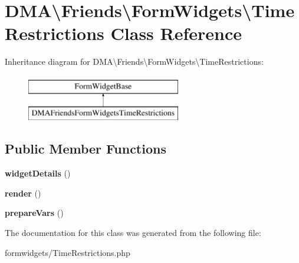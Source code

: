 \hypertarget{classDMA_1_1Friends_1_1FormWidgets_1_1TimeRestrictions}{\section{D\-M\-A\textbackslash{}Friends\textbackslash{}Form\-Widgets\textbackslash{}Time\-Restrictions Class Reference}
\label{classDMA_1_1Friends_1_1FormWidgets_1_1TimeRestrictions}
}
Inheritance diagram for D\-M\-A\textbackslash{}Friends\textbackslash{}Form\-Widgets\textbackslash{}Time\-Restrictions\-:\begin{figure}[H]
\begin{center}
\leavevmode
\includegraphics[height=2.000000cm]{dc/d09/classDMA_1_1Friends_1_1FormWidgets_1_1TimeRestrictions}
\end{center}
\end{figure}
\subsection*{Public Member Functions}
\begin{DoxyCompactItemize}
\item 
\hypertarget{classDMA_1_1Friends_1_1FormWidgets_1_1TimeRestrictions_a74be261bb83b3287ff8ea66f1f148f89}{{\bfseries widget\-Details} ()}\label{classDMA_1_1Friends_1_1FormWidgets_1_1TimeRestrictions_a74be261bb83b3287ff8ea66f1f148f89}

\item 
\hypertarget{classDMA_1_1Friends_1_1FormWidgets_1_1TimeRestrictions_a24e7d7ab71003ca1fbff26b8c015c66e}{{\bfseries render} ()}\label{classDMA_1_1Friends_1_1FormWidgets_1_1TimeRestrictions_a24e7d7ab71003ca1fbff26b8c015c66e}

\item 
\hypertarget{classDMA_1_1Friends_1_1FormWidgets_1_1TimeRestrictions_a3a508c4fc9687a575a7e88c239c0a4f2}{{\bfseries prepare\-Vars} ()}\label{classDMA_1_1Friends_1_1FormWidgets_1_1TimeRestrictions_a3a508c4fc9687a575a7e88c239c0a4f2}

\end{DoxyCompactItemize}


The documentation for this class was generated from the following file\-:\begin{DoxyCompactItemize}
\item 
formwidgets/Time\-Restrictions.\-php\end{DoxyCompactItemize}
